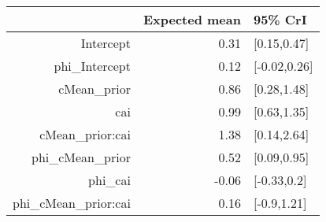 \begin{tabular}{rrl}
  \hline
 & Expected mean & 95\% CrI \\ 
  \hline
Intercept & 0.31 & [0.15,0.47] \\ 
  phi\_Intercept & 0.12 & [-0.02,0.26] \\ 
  cMean\_prior & 0.86 & [0.28,1.48] \\ 
  cai & 0.99 & [0.63,1.35] \\ 
  cMean\_prior:cai & 1.38 & [0.14,2.64] \\ 
  phi\_cMean\_prior & 0.52 & [0.09,0.95] \\ 
  phi\_cai & -0.06 & [-0.33,0.2] \\ 
  phi\_cMean\_prior:cai & 0.16 & [-0.9,1.21] \\ 
   \hline
\end{tabular}

